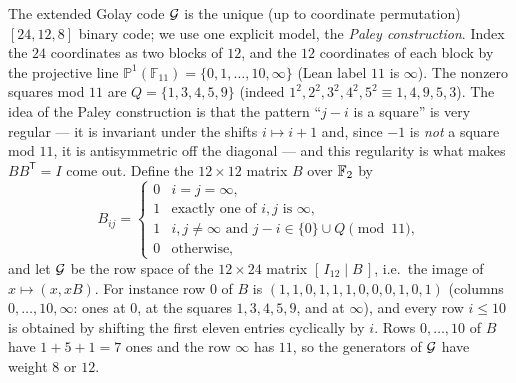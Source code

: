 The extended Golay code $\mathcal{G}$ is the unique (up to coordinate permutation) $[24,12,8]$ binary
code; we use one explicit model, the \emph{Paley construction}.  Index the $24$ coordinates as two
blocks of $12$, and the $12$ coordinates of each block by the projective line
$\mathbb{P}^1(\mathbb{F}_{11})=\{0,1,\dots,10,\infty\}$ (Lean label $11$ is $\infty$).  The
nonzero squares mod $11$ are $Q=\{1,3,4,5,9\}$ (indeed $1^2,2^2,3^2,4^2,5^2\equiv1,4,9,5,3$).
The idea of the Paley construction is that the pattern ``$j-i$ is a square'' is very regular ---
it is invariant under the shifts $i\mapsto i+1$ and, since $-1$ is \emph{not} a square mod $11$,
it is antisymmetric off the diagonal --- and this regularity is what makes $BB^{\mathsf T}=I$
come out.  Define the $12\times12$ matrix $B$ over $\mathbb{F}_2$
by
\begin{equation*}
B_{ij}=\begin{cases}
0&i=j=\infty,\\ 1&\text{exactly one of }i,j\text{ is }\infty,\\
1&i,j\neq\infty\text{ and }j-i\in\{0\}\cup Q\pmod{11},\\ 0&\text{otherwise,}
\end{cases}
\end{equation*}
and let $\mathcal{G}$ be the row space of the $12\times24$ matrix $[\,I_{12}\mid B\,]$, i.e.\ the image
of $x\mapsto(x,xB)$.  For instance row $0$ of $B$ is
$(1,1,0,1,1,1,0,0,0,1,0,1)$ (columns $0,\dots,10,\infty$: ones at $0$, at the squares
$1,3,4,5,9$, and at $\infty$), and every row $i\le10$ is obtained by shifting the first eleven
entries cyclically by $i$.  Rows $0,\dots,10$ of $B$ have $1+5+1=7$ ones and the row $\infty$ has $11$,
so the generators of $\mathcal{G}$ have weight $8$ or $12$.

